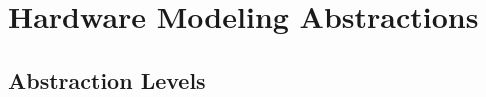\documentclass[sigplan,review,nonacm,9pt]{acmart}
\begin{document}


\section{Hardware Modeling Abstractions}

\subsection{Abstraction Levels}
\end{document}
